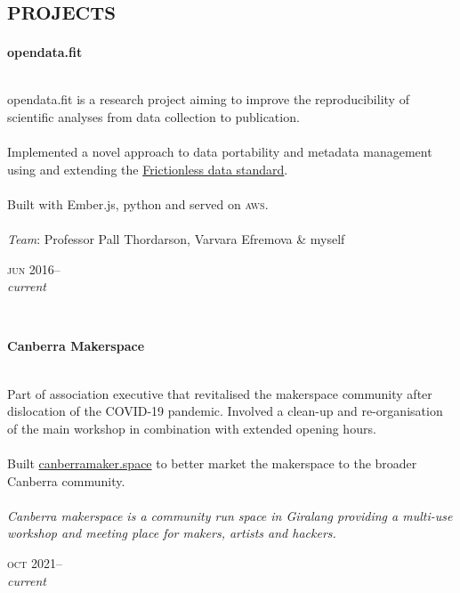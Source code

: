 
\vspace{-0.6cm}
\section*{\textsc{projects}}
\vspace{-0.2cm}

\begin{minipage}[t]{\mainboxwidth\textwidth}
\textbf{opendata.fit}\\
{\small
\\
opendata.fit is a research project aiming to improve the reproducibility of scientific analyses from data collection to publication.\\
\\
Implemented a novel approach to data portability and metadata management using and extending the \href{https://frictionlessdata.io}{Frictionless data standard}.\\
\\
Built with Ember.js, python and served on \textsc{aws}.\\
\\
\textit{Team}: Professor Pall Thordarson, Varvara Efremova \& myself \\
\par}
\end{minipage}
\begin{minipage}[t]{\detailboxwidth\textwidth}
{
\hfill \textsc{jun} 2016--\\ 
\hspace*{0pt} \hfill \textit{\small current}
\par
}
\end{minipage}
\\

\begin{minipage}[t]{\mainboxwidth\textwidth}
\textbf{Canberra Makerspace}\\
\\
{\small
Part of association executive that revitalised the makerspace community after dislocation of the COVID-19 pandemic. Involved a clean-up and re-organisation of the main workshop in combination with extended opening hours. \\
\\
Built \href{https://canberramaker.space/}{canberramaker.space} to better market the makerspace to the broader Canberra community.
\\
\\
\textit{Canberra makerspace is a community run space in Giralang providing a multi-use workshop and meeting place for makers, artists and hackers.}
\par}
\end{minipage}
\begin{minipage}[t]{\detailboxwidth\textwidth}
{
\hfill \textsc{oct} 2021--\\ 
\hspace*{0pt} \hfill \textit{\small current}
\par
}
\end{minipage}
\\

